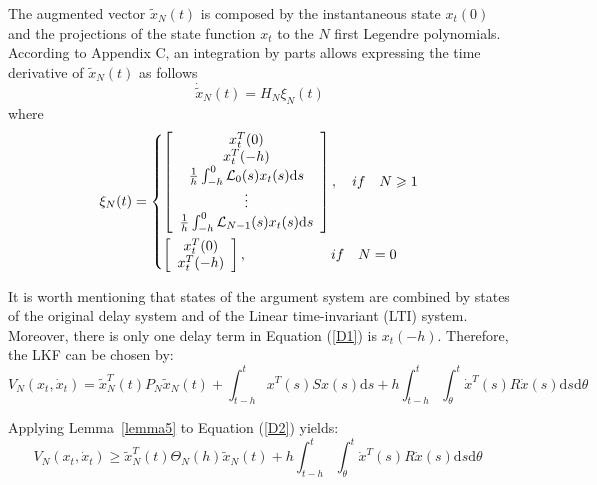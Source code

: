 \documentclass[a4paper]{cas-sc}
\begin{document}
The augmented vector ${\tilde x_N}(t) $ is composed by the instantaneous state ${x_t}(0) $ and the projections of the state function $ {x_t}$ to the $N $ first Legendre polynomials. According to Appendix C, an integration by parts allows expressing the time derivative of ${\tilde x_N}(t) $ as follows
\begin{equation}
  {\dot {\tilde x}_N}(t) = {H_N}{\xi _N}(t)
  \label{D1}
\end{equation}
where
\begin{equation}
  {\xi _N}(t) = \left\{ \begin{gathered}
    \left[ {\begin{array}{*{20}{c}}
            {x_t^T(0)}                                                          \\
            {x_t^T( - h)}                                                       \\
            {\frac{1}{h}\int_{ - h}^0 {{\mathcal{L}_0}} (s){x_t}(s){\text{d}}s} \\
            \vdots                                                              \\
            {\frac{1}{h}\int_{ - h}^0 {{\mathcal{L}_{N - 1}}} (s){x_t}(s){\text{d}}s}
          \end{array}} \right],\quad if\quad N \geqslant 1 \hfill \\
    \left[ {\begin{array}{*{20}{c}}
            {x_t^T(0)} \\
            {x_t^T( - h)}
          \end{array}} \right],\quad \quad \quad \quad \quad \quad if\quad N = 0 \hfill \\
  \end{gathered}  \right.
  \label{DX2}
\end{equation}

It is worth mentioning that states of the argument system are combined by states of the original delay system and of the Linear time-invariant (LTI) system. Moreover, there is only one delay term in Equation (\ref{D1}) is ${x_t}( - h)$. Therefore, the LKF can be chosen by:
\begin{equation}
  {V_N}\left( {{x_t},{{\dot x}_t}} \right) = \tilde x_N^T(t){P_N}{\tilde x_N}(t) + \int_{t - h}^t {{x^T}(s)Sx(s){\text{d}}s}  + h\int_{t - h}^t {\int_\theta ^t {{{\dot x}^T}(s)R\dot x(s){\text{d}}s{\text{d}}\theta } }
  \label{D2}
\end{equation}

Applying Lemma~\ref{lemma5} to Equation (\ref{D2}) yields:
\begin{equation}
  {V_N}\left( {{x_t},{{\dot x}_t}} \right) \geqslant \tilde x_N^T(t){\Theta _N}(h){\tilde x_N}(t) + h\int_{t - h}^t {\int_\theta ^t {{{\dot x}^T}(s)R\dot x(s){\text{d}}s{\text{d}}\theta } } \;
  \label{D3}
\end{equation}
\end{document}
